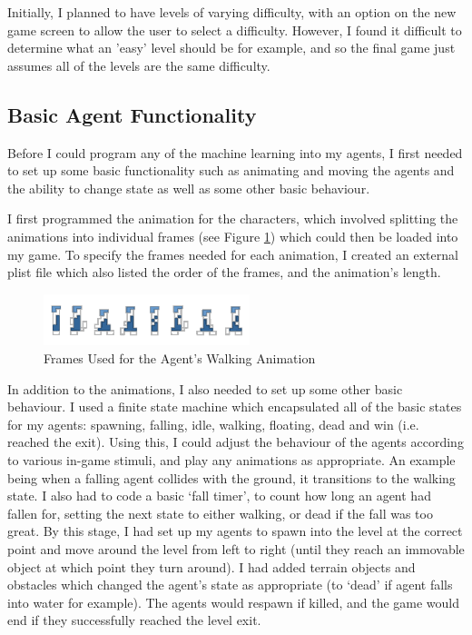\documentclass[a4paper,oneside]{report}
\begin{document}
Initially, I planned to have levels of varying difficulty, with an option on the new game screen to allow the user to select a difficulty. However, I found it difficult to determine what an 'easy' level should be for example, and so the final game just assumes all of the levels are the same difficulty. 

\subsection{Basic Agent Functionality}

Before I could program any of the machine learning into my agents, I first needed to set up some basic functionality such as animating and moving the agents and the ability to change state as well as some other basic behaviour.

I first programmed the animation for the characters, which involved splitting the animations into individual frames (see Figure \ref{fig:WalkingFrames}) which could then be loaded into my game. To specify the frames needed for each animation, I created an external plist file which also listed the order of the frames, and the animation's length. 

\begin{figure}[h!]
  \centering
    \includegraphics[width=60mm]{sources/images/Lemming_walk_anim}
    \caption{Frames Used for the Agent's Walking Animation}
    \label{fig:WalkingFrames}
\end{figure}

In addition to the animations, I also needed to set up some other basic behaviour. I used a finite state machine which encapsulated all of the basic states for my agents: spawning, falling, idle, walking, floating, dead and win (i.e. reached the exit). Using this, I could adjust the behaviour of the agents according to various in-game stimuli, and play any animations as appropriate. An example being when a falling agent collides with the ground, it transitions to the walking state. I also had to code a basic `fall timer', to count how long an agent had fallen for, setting the next state to either walking, or dead if the fall was too great. By this stage, I had set up my agents to spawn into the level at the correct point and move around the level from left to right (until they reach an immovable object at which point they turn around). I had added terrain objects and obstacles which changed the agent's state as appropriate (to `dead' if agent falls into water for example). The agents would respawn if killed, and the game would end if they successfully reached the level exit.
\end{document}
